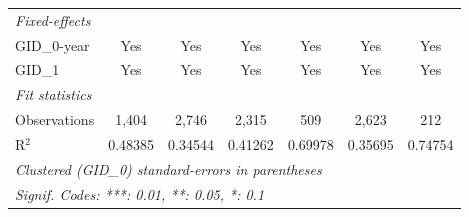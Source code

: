 \begin{table}[H]
\begin{tabular}{lcccccc}
      \midrule
      \emph{Fixed-effects}\\
      GID\_0-year                                          & Yes      & Yes            & Yes           & Yes          & Yes            & Yes\\  
      GID\_1                                               & Yes      & Yes            & Yes           & Yes          & Yes            & Yes\\  
      \midrule
      \emph{Fit statistics}\\
      Observations                                         & 1,404    & 2,746          & 2,315         & 509          & 2,623          & 212\\  
      R$^2$                                                & 0.48385  & 0.34544        & 0.41262       & 0.69978      & 0.35695        & 0.74754\\  
      \midrule \midrule
      \multicolumn{7}{l}{\emph{Clustered (GID\_0) standard-errors in parentheses}}\\
      \multicolumn{7}{l}{\emph{Signif. Codes: ***: 0.01, **: 0.05, *: 0.1}}\\
   \end{tabular}
\end{table}


